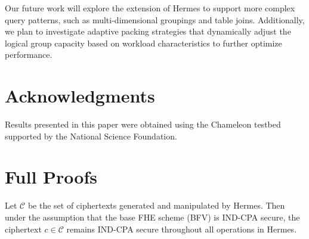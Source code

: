 \documentclass[sigconf,nonacm]{acmart}
\begin{document}
Our future work will explore the extension of Hermes to support more complex query patterns, such as multi-dimensional groupings and table joins. Additionally, we plan to investigate adaptive packing strategies that dynamically adjust the logical group capacity based on workload characteristics to further optimize performance. 

\section*{Acknowledgments} Results presented in this paper were obtained using the Chameleon testbed supported by the National Science Foundation.




\clearpage
\appendix

\section{Full Proofs}
\label{appendix:proofs}

\begin{lemma}
Let $\mathcal{C}$ be the set of ciphertexts generated and manipulated by Hermes. Then under the assumption that the base FHE scheme (BFV) is IND-CPA secure, the ciphertext $c \in \mathcal{C}$ remains IND-CPA secure throughout all operations in Hermes.
\end{lemma}
\end{document}
